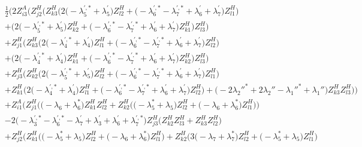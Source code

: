 \begin{align} 
 &\frac{1}{2} \Big(2 Z_{{i 3}}^{A} \Big(Z_{{j 2}}^{H} \Big(Z_{{k 3}}^{H} \Big(2 \Big(- \lambda^{{\prime},*}_5  + \lambda^{\prime}_5\Big)Z_{{l 2}}^{H}  + \Big(- \lambda^{{\prime},*}_6  - \lambda^{{\prime},*}_7  + \lambda^{\prime}_6 + \lambda^{\prime}_7\Big)Z_{{l 1}}^{H} \Big)\nonumber \\ 
 &+\Big(2 \Big(- \lambda^{{\prime},*}_5  + \lambda^{\prime}_5\Big)Z_{{k 2}}^{H}  + \Big(- \lambda^{{\prime},*}_6  - \lambda^{{\prime},*}_7  + \lambda^{\prime}_6 + \lambda^{\prime}_7\Big)Z_{{k 1}}^{H} \Big)Z_{{l 3}}^{H} \Big)\nonumber \\ 
 &+Z_{{j 1}}^{H} \Big(Z_{{k 3}}^{H} \Big(2 \Big(- \lambda^{{\prime},*}_4  + \lambda^{\prime}_4\Big)Z_{{l 1}}^{H}  + \Big(- \lambda^{{\prime},*}_6  - \lambda^{{\prime},*}_7  + \lambda^{\prime}_6 + \lambda^{\prime}_7\Big)Z_{{l 2}}^{H} \Big)\nonumber \\ 
 &+\Big(2 \Big(- \lambda^{{\prime},*}_4  + \lambda^{\prime}_4\Big)Z_{{k 1}}^{H}  + \Big(- \lambda^{{\prime},*}_6  - \lambda^{{\prime},*}_7  + \lambda^{\prime}_6 + \lambda^{\prime}_7\Big)Z_{{k 2}}^{H} \Big)Z_{{l 3}}^{H} \Big)\nonumber \\ 
 &+Z_{{j 3}}^{H} \Big(Z_{{k 2}}^{H} \Big(2 \Big(- \lambda^{{\prime},*}_5  + \lambda^{\prime}_5\Big)Z_{{l 2}}^{H}  + \Big(- \lambda^{{\prime},*}_6  - \lambda^{{\prime},*}_7  + \lambda^{\prime}_6 + \lambda^{\prime}_7\Big)Z_{{l 1}}^{H} \Big)\nonumber \\ 
 &+Z_{{k 1}}^{H} \Big(2 \Big(- \lambda^{{\prime},*}_4  + \lambda^{\prime}_4\Big)Z_{{l 1}}^{H}  + \Big(- \lambda^{{\prime},*}_6  - \lambda^{{\prime},*}_7  + \lambda^{\prime}_6 + \lambda^{\prime}_7\Big)Z_{{l 2}}^{H} \Big)+\Big(-2 \lambda_2''^*  + 2 \lambda_2''  - \lambda_1''^*  + \lambda_1''\Big)Z_{{k 3}}^{H} Z_{{l 3}}^{H} \Big)\Big)\nonumber \\ 
 &+Z_{{i 1}}^{A} \Big(Z_{{j 1}}^{H} \Big(\Big(- \lambda_6  + \lambda_6^*\Big)Z_{{k 1}}^{H} Z_{{l 2}}^{H}  + Z_{{k 2}}^{H} \Big(\Big(- \lambda_5^*  + \lambda_5\Big)Z_{{l 2}}^{H}  + \Big(- \lambda_6  + \lambda_6^*\Big)Z_{{l 1}}^{H} \Big)\Big)\nonumber \\ 
 &-2 \Big(- \lambda^{{\prime},*}_3  - \lambda^{{\prime},*}_6  - \lambda^{\prime}_7  + \lambda^{\prime}_3 + \lambda^{\prime}_6 + \lambda^{{\prime},*}_7\Big)Z_{{j 3}}^{H} \Big(Z_{{k 2}}^{H} Z_{{l 3}}^{H}  + Z_{{k 3}}^{H} Z_{{l 2}}^{H} \Big)\nonumber \\ 
 &+Z_{{j 2}}^{H} \Big(Z_{{k 1}}^{H} \Big(\Big(- \lambda_5^*  + \lambda_5\Big)Z_{{l 2}}^{H}  + \Big(- \lambda_6  + \lambda_6^*\Big)Z_{{l 1}}^{H} \Big)+Z_{{k 2}}^{H} \Big(3 \Big(- \lambda_7  + \lambda_7^*\Big)Z_{{l 2}}^{H}  + \Big(- \lambda_5^*  + \lambda_5\Big)Z_{{l 1}}^{H} \Big)\nonumber \\ 

\end{align}
